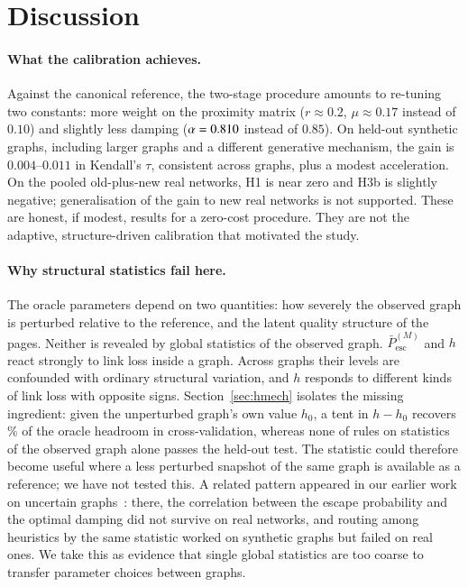 \documentclass[11pt,a4paper]{article}
\theoremstyle{definition}
\theoremstyle{remark}
\newcommand{\Pbar}{\bar P^{(M)}_{\mathrm{esc}}}
\begin{document}
\FloatBarrier
\section{Discussion}
\label{sec:discussion}

\paragraph{What the calibration achieves.} Against the canonical reference, the two-stage procedure
amounts to re-tuning two constants: more weight on the proximity matrix ($r\approx0.2$, $\mu\approx0.17$
instead of $0.10$) and slightly less damping ($\alpha=0.810$ instead of $0.85$). On held-out
synthetic graphs, including larger graphs and a different generative mechanism, the gain is
$0.004$--$0.011$ in Kendall's $\tau$, consistent across graphs, plus a modest acceleration. On the
pooled old-plus-new real networks, H1 is near zero and H3b is slightly negative; generalisation
of the gain to new real networks is not supported. These are honest, if modest, results for a
zero-cost procedure. They are not the adaptive, structure-driven calibration that motivated the study.

\paragraph{Why structural statistics fail here.} The oracle parameters depend on two quantities: how
severely the observed graph is perturbed relative to the reference, and the latent quality structure
of the pages. Neither is revealed by global statistics of the observed graph. $\Pbar$ and $h$ react
strongly to link loss inside a graph. Across graphs their levels are confounded with ordinary
structural variation, and $h$ responds to different kinds of link loss with opposite signs.
Section~\ref{sec:hmech} isolates the missing ingredient: given the unperturbed graph's own value $h_0$,
a tent in $h-h_0$ recovers \NmDhShare\% of the oracle headroom in cross-validation, whereas none of
\NmRules{} rules on statistics of the observed graph alone passes the held-out test. The statistic
could therefore become useful where a less perturbed snapshot of the same graph is available as a
reference; we have not tested this. A related
pattern appeared in our earlier work on uncertain graphs~\cite{konstantellos26}: there, the correlation
between the escape probability and the optimal damping did not survive on real networks, and routing
among heuristics by the same statistic worked on synthetic graphs but failed on real ones. We take this
as evidence that single global statistics are too coarse to transfer parameter choices between graphs.
\end{document}
